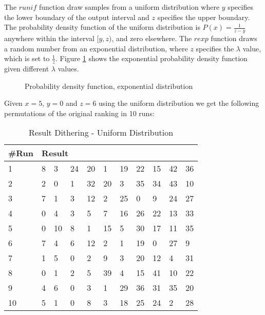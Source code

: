 The $runif$ function draw samples from a uniform distribution where $y$ specifies the lower boundary of the output interval and $z$ specifies the upper boundary. The probability density function of the uniform distribution is $P(x) = \frac{1}{z-y}$ anywhere within the interval $[y, z)$, and zero elsewhere. The $rexp$ function draws a random number from an exponential distribution, where $z$ specifies the $\lambda$ value, which is set to $\frac{1}{z}$. Figure \ref{fig:expdist} shows the exponential probability density function given different $\lambda$ values.

\begin{figure}[H]
\label{fig:expdist}
  \centering
    \caption{Probability density function, exponential distribution}
\end{figure}

Given $x=5$, $y=0$ and $z=6$ using the uniform distribution we get the following permutations of the original ranking in 10 runs:

\begin{table}[H]
	\centering
	\begin{tabular}{*{11}l}
	\toprule
	\multicolumn{1}{l}{\#Run} & \multicolumn{10}{l}{Result} \\ \midrule
	1 	& 8 & 3 &  24 &  20 &  1 &  19 &  22 &  15 &  42 &  36 \\
	2 	& 2 &  0 &  1 &  32 &  20 &  3 &  35 &  34 &  43 &  10 \\
	3	& 7 &  1 &  3 &  12 &  2 &  25 &  0 &  9 &  24 &  27\\
	4	& 0 &  4 &  3 &  5 &  7 &  16 &  26 &  22 &  13 &  33\\
	5	& 0 &  10 &  8 &  1 &  15 &  5 &  30 &  17 &  11 &  35\\
	6	& 7 &  4 &  6 &  12 &  2 &  1 &  19 &  0 &  27 &  9\\
	7	& 1 &  5 &  0 &  2 &  9 &  3 &  20 &  12 &  4 &  31\\
	8	& 0 &  1 &  2 &  5 &  39 &  4 &  15 &  41 &  10 &  22\\
	9	& 4 &  6 &  0 &  3 &  1 &  29 &  36 &  31 &  35 &  20\\
	10	& 5 &  1 &  0 &  8 &  3 &  18 &  25 & 24 & 2 & 28\\
	\bottomrule
\end{tabular}
\caption{Result Dithering - Uniform Distribution}
\end{table}

